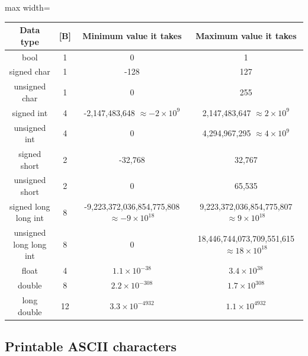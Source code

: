 \documentclass[letterpaper,landscape]{article}
\begin{document}
\begin{center}
    \begin{adjustbox}{max width=\columnwidth}
    \renewcommand{\arraystretch}{1.3}
    \begin{tabular}{c|c|c|c}
        \textbf{Data type} & \textbf{[B]} & \textbf{Minimum value it takes} & \textbf{Maximum value it takes} \\ \hline
        bool & 1 & 0 & 1 \\ \hline
        signed char & 1 & -128 & 127 \\
        unsigned char & 1 & 0 & 255 \\ \hline
        signed int & 4 & -2,147,483,648 $\approx -2 \times 10^9$ & 2,147,483,647 $\approx 2 \times 10^9$ \\
        unsigned int & 4 & 0 & 4,294,967,295 $\approx 4 \times 10^9$ \\ \hline
        signed short & 2 & -32,768 & 32,767 \\
        unsigned short & 2 & 0 & 65,535 \\ \hline
        signed long long int & 8 & -9,223,372,036,854,775,808 $\approx -9 \times 10^{18}$ & 9,223,372,036,854,775,807 $\approx 9 \times 10^{18}$ \\
        unsigned long long int & 8 & 0 & 18,446,744,073,709,551,615 $\approx 18 \times 10^{18}$ \\ \hline
        float & 4 & $1.1 \times 10^{-38}$ & $3.4 \times 10^{38}$ \\
        double & 8 & $2.2 \times 10^{-308}$ & $1.7 \times 10^{308}$ \\
        long double & 12 & $3.3 \times 10^{-4932}$ & $1.1 \times 10^{4932}$ \\
    \end{tabular}
    \end{adjustbox}
    \captionsetup{hypcap=false}
    \captionsetup{hypcap=true}
\end{center}

\newpage
\subsection{Printable ASCII characters}
\end{document}
